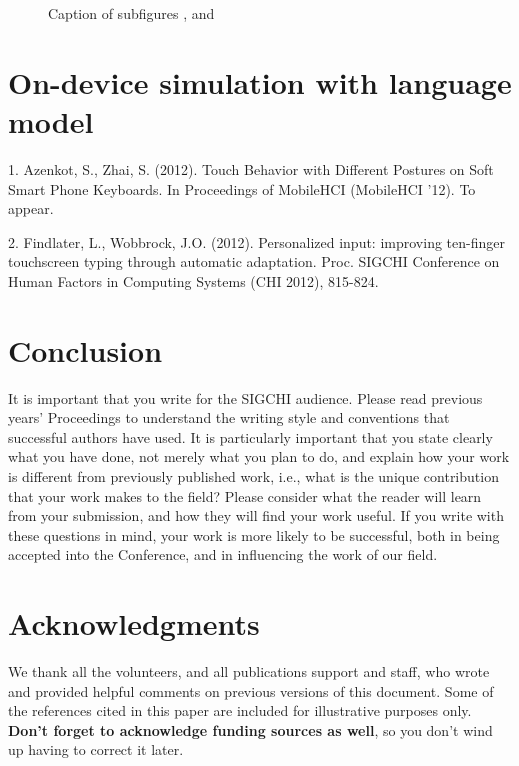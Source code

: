 \documentclass{sigchi}
\begin{document}
\begin{figure}[tb]
{    \label{fig:subfig3}
	}
	\caption[Optional caption for list of figures]{Caption of subfigures
	,  and }
	\label{fig:subfigureExample}
\end{figure}

\section{On-device simulation with language model}



1. Azenkot, S.,  Zhai, S. (2012). Touch Behavior with Different Postures on Soft Smart Phone Keyboards. In Proceedings of MobileHCI (MobileHCI '12). To appear.

2. Findlater, L., Wobbrock, J.O. (2012). Personalized input: improving ten-finger touchscreen typing through automatic adaptation. Proc. SIGCHI Conference on Human Factors in Computing Systems (CHI 2012), 815-824.
\section{Conclusion}

It is important that you write for the SIGCHI audience.  Please read
previous years' Proceedings to understand the writing style and
conventions that successful authors have used.  It is particularly
important that you state clearly what you have done, not merely what
you plan to do, and explain how your work is different from previously
published work, i.e., what is the unique contribution that your work
makes to the field?  Please consider what the reader will learn from
your submission, and how they will find your work useful.  If you
write with these questions in mind, your work is more likely to be
successful, both in being accepted into the Conference, and in
influencing the work of our field.

\section{Acknowledgments}

We thank all the volunteers, and all publications support
and staff, who wrote and provided helpful comments on previous
versions of this document.  Some of the references cited in this paper
are included for illustrative purposes only.  \textbf{Don't forget
to acknowledge funding sources as well}, so you don't wind up
having to correct it later.
\end{document}
